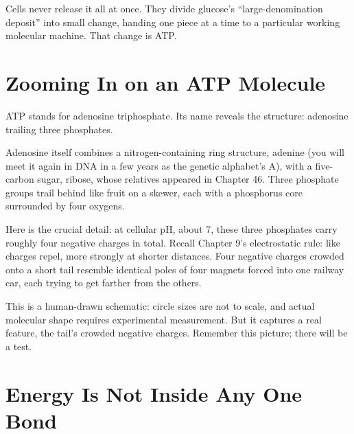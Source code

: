 Cells never release it all at once. They divide glucose's ``large-denomination deposit'' into small change, handing one piece at a time to a particular working molecular machine. That change is ATP.

\section{Zooming In on an ATP Molecule}

ATP stands for adenosine triphosphate. Its name reveals the structure: adenosine trailing three phosphates.

Adenosine itself combines a nitrogen-containing ring structure, adenine (you will meet it again in DNA in a few years as the genetic alphabet's A), with a five-carbon sugar, ribose, whose relatives appeared in Chapter 46. Three phosphate groups trail behind like fruit on a skewer, each with a phosphorus core surrounded by four oxygens.

Here is the crucial detail: at cellular pH, about 7, these three phosphates carry roughly four negative charges in total. Recall Chapter 9's electrostatic rule: like charges repel, more strongly at shorter distances. Four negative charges crowded onto a short tail resemble identical poles of four magnets forced into one railway car, each trying to get farther from the others.

\begin{center}
\end{center}

This is a human-drawn schematic: circle sizes are not to scale, and actual molecular shape requires experimental measurement. But it captures a real feature, the tail's crowded negative charges. Remember this picture; there will be a test.

\section{Energy Is Not Inside Any One Bond}


